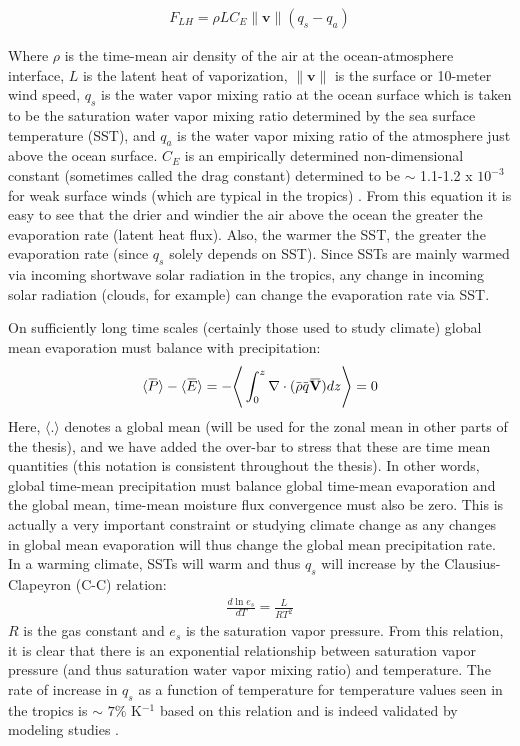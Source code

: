 \documentclass[letterpaper,12pt,titlepage,oneside,final]{book}
\newcommand{\norm}[1]{\lVert#1\rVert}
\newcommand{\overbar}[1]{\mkern 1.5mu\overline{\mkern-1.5mu#1\mkern-1.5mu}\mkern 1.5mu}
\begin{document}
\begin{align}
F_{LH}=\rho{L}C_{E}\norm{\textbf{v}}(q_{s}-q_{a})
\end{align}

Where $\rho$ is the time-mean air density of the air at the ocean-atmosphere interface, $L$ is the latent heat of vaporization, $\norm{\textbf{v}}$ is the surface or 10-meter wind speed, $q_{s}$ is the water vapor mixing ratio at the ocean surface which is taken to be the saturation water vapor mixing ratio determined by the sea surface temperature (SST), and $q_{a}$ is the water vapor mixing ratio of the atmosphere just above the ocean surface. $C_{E}$ is an empirically determined non-dimensional constant (sometimes called the drag constant) determined to be $\sim$ 1.1-1.2 x $10^{-3}$ for weak surface winds (which are typical in the tropics) \cite{katsaros_evaporation_2001}. From this equation it is easy to see that the drier and windier the air above the ocean the greater the evaporation rate (latent heat flux). Also, the warmer the SST, the greater the evaporation rate (since $q_{s}$ solely depends on SST). Since SSTs are mainly warmed via incoming shortwave solar radiation in the tropics, any change in incoming solar radiation (clouds, for example) can change the evaporation rate via SST. 

On sufficiently long time scales (certainly those used to study climate) global mean evaporation must balance with precipitation:
\begin{align}
\langle\overbar{P}\rangle-\langle\overbar{E}\rangle=-\Bigg\langle\int_{0}^{z}\mathbf{\nabla}\cdot(\overbar{\rho}{\overbar{q}}\overbar{\mathbf{V}})dz\Bigg\rangle=0
\end{align}
Here, $\langle{.}\rangle$ denotes a global mean (will be used for the zonal mean in other parts of the thesis), and we have added the over-bar to stress that these are time mean quantities (this notation is consistent throughout the thesis). In other words, global time-mean precipitation must balance global time-mean evaporation and the global mean, time-mean moisture flux convergence must also be zero. This is actually a very important constraint or studying climate change as any changes in global mean evaporation will thus change the global mean precipitation rate. In a warming climate, SSTs will warm and thus $q_{s}$ will increase by the Clausius-Clapeyron (C-C) relation:
\begin{align}
\frac{d\ln{e_{s}}}{dT}=\frac{L}{RT^{2}}
\end{align}
$R$ is the gas constant and $e_{s}$ is the saturation vapor pressure. From this relation, it is clear that there is an exponential relationship between saturation vapor pressure (and thus saturation water vapor mixing ratio) and temperature. The rate of increase in $q_s$ as a function of temperature for temperature values seen in the tropics is $\sim$ $7 \%$ K$^{-1}$ based on this relation and is indeed validated by modeling studies \cite{held_robust_2006,vecchi_weakening_2006}. 
\end{document}
